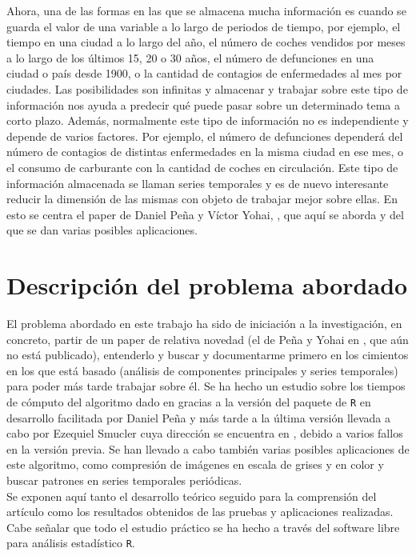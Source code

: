 Ahora, una de las formas en las que se almacena mucha información es cuando se guarda el valor de una variable a lo largo de periodos de tiempo, por ejemplo, el tiempo en una ciudad a lo largo del año, el número de coches vendidos por meses a lo largo de los últimos 15, 20 o 30 años, el número de defunciones en una ciudad o país desde 1900, o la cantidad de contagios de enfermedades al mes por ciudades. Las posibilidades son infinitas y almacenar y trabajar sobre este tipo de información nos ayuda a predecir qué puede pasar sobre un determinado tema a corto plazo. Además, normalmente este tipo de información no es independiente y depende de varios factores. Por ejemplo, el número de defunciones dependerá del número de contagios de distintas enfermedades en la misma ciudad en ese mes, o el consumo de carburante con la cantidad de coches en circulación. Este tipo de información almacenada se llaman series temporales y es de nuevo interesante reducir la dimensión de las mismas con objeto de trabajar mejor sobre ellas. En esto se centra el paper de Daniel Peña y Víctor Yohai, \cite{pena16}, que aquí se aborda y del que se dan varias posibles aplicaciones.


\section{Descripción del problema abordado}
El problema abordado en este trabajo ha sido de iniciación a la investigación, en concreto, partir de un paper de relativa novedad (el de Peña y Yohai en \cite{pena16}, que aún no está publicado), entenderlo y buscar y documentarme primero en los cimientos en los que está basado (análisis de componentes principales y series temporales) para poder más tarde trabajar sobre él. Se ha hecho un estudio sobre los tiempos de cómputo del algoritmo dado en \cite{pena16} gracias a la versión del paquete de \texttt{R} en desarrollo facilitada por Daniel Peña y más tarde a la última versión llevada a cabo por Ezequiel Smucler cuya dirección se encuentra en \cite{ezeq}, debido a varios fallos en la versión previa. Se han llevado a cabo también varias posibles aplicaciones de este algoritmo, como compresión de imágenes en escala de grises y en color y buscar patrones en series temporales periódicas.\\ %

Se exponen aquí tanto el desarrollo teórico seguido para la comprensión del artículo como los resultados obtenidos de las pruebas y aplicaciones realizadas. Cabe señalar que todo el estudio práctico se ha hecho a través del software libre para análisis estadístico \texttt{R}.


